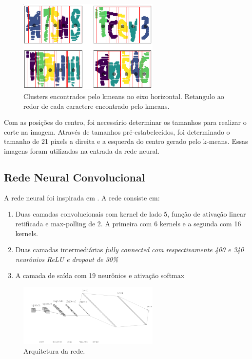 \documentclass[11pt]{article}
\begin{document}
  \begin{figure}[H]
        {\centering
        \includegraphics[width=70mm]{images/1dkmeans.png}
        \caption{Clusters encontrados pelo kmeans no eixo horizontal. Retangulo ao redor de cada caractere encontrado pelo kmeans.}
        \label{fig:kmeans1d}\par}
  \end{figure}

Com as posições do centro, foi necessário determinar os tamanhos para realizar o corte na imagem. Através de tamanhos pré-estabelecidos, foi determinado o tamanho de 21 pixels a direita e a esquerda do centro gerado pelo k-means. Essas imagens foram utilizadas na entrada da rede neural. 

\subsection{Rede Neural Convolucional}
\label{ssec:convnet}

A rede neural foi inspirada em \cite{kopp2017}. A rede consiste em:

\begin{enumerate}
\item
    Duas camadas convolucionais com kernel de lado 5, função de ativação linear retificada e max-polling de 2. A primeira com 6 kernels e a segunda com 16 kernels.
\item
    Duas camadas intermediárias \em fully connected \em com respectivamente 400 e 340 neurônios ReLU e dropout de 30\%
\item
    A camada de saída com 19 neurônios e ativação softmax
\end{enumerate}

  \begin{figure}[H]
        {\centering
        \includegraphics[width=70mm]{images/nn.png}
        \caption{Arquitetura da rede.}
        \label{fig:nn}\par}
  \end{figure}
\end{document}

